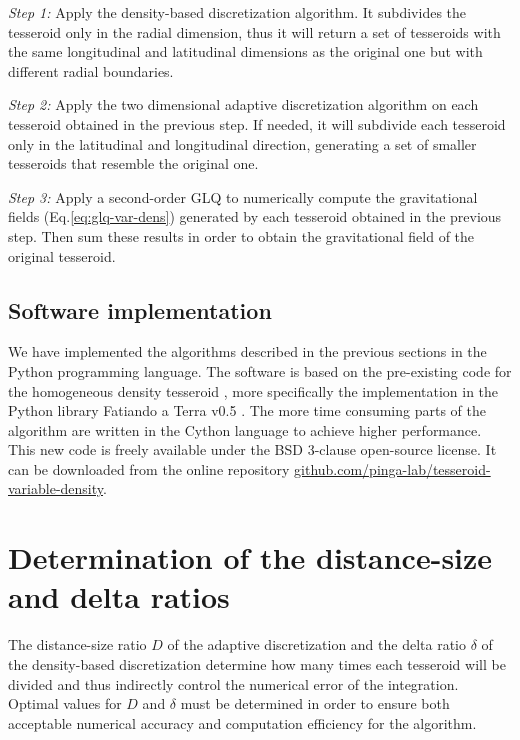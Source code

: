 \documentclass[extra, referee]{gji}
\begin{document}
\textit{Step 1:}
Apply the density-based discretization algorithm.
It subdivides the tesseroid only in the radial dimension, thus it will return a set of
tesseroids with the same longitudinal and latitudinal dimensions as the original one but
with different radial boundaries.

\textit{Step 2:}
Apply the two dimensional adaptive discretization algorithm on each tesseroid obtained
in the previous step.
If needed, it will subdivide each tesseroid only in the latitudinal and longitudinal
direction, generating a set of smaller tesseroids that resemble the original one.

\textit{Step 3:}
Apply a second-order GLQ to numerically compute the gravitational fields
(Eq.\ref{eq:glq-var-dens}) generated by each tesseroid obtained in the
previous step.
Then sum these results in order to obtain the gravitational field of the original
tesseroid.


\subsection{Software implementation}

We have implemented the algorithms described in the previous sections in the Python
programming language.
The software is based on the pre-existing code for the homogeneous density tesseroid
\citep{Uieda2016}, more specifically the implementation in the Python library Fatiando a
Terra v0.5 \citep{Uieda2013}.
The more time consuming parts of the algorithm are written in the Cython language to
achieve higher performance.
This new code is freely available under the BSD 3-clause open-source license.
It can be downloaded from the online repository
\href{https://github.com/pinga-lab/tesseroid-variable-density}{github.com/pinga-lab/tesseroid-variable-density}.




\section{Determination of the distance-size and delta ratios}

The distance-size ratio $D$ of the adaptive discretization and the delta ratio $\delta$
of the density-based discretization determine how many times each tesseroid will be
divided and thus indirectly control the numerical error of the integration.
Optimal values for $D$ and $\delta$ must be determined in order to ensure both
acceptable numerical accuracy and computation efficiency for the algorithm.
\end{document}
